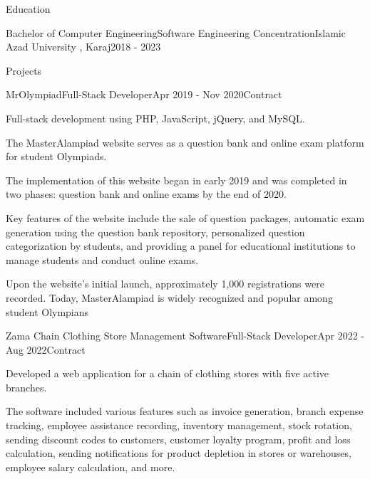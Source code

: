 \documentclass[]{kyvernitis-resume}
\begin{document}
\begin{section}{Education}

   \begin{subsectionnobullet}{Bachelor of Computer Engineering}{Software Engineering Concentration}{Islamic Azad University , Karaj}{2018 - 2023}
    \end{subsectionnobullet}
    
\end{section}

\begin{section}{Projects}
    \begin{subsection}{MrOlympiad}{Full-Stack Developer}{Apr 2019 - Nov 2020}{Contract}
     		\item Full-stack development using PHP, JavaScript, jQuery, and MySQL.
		\item	The MasterAlampiad website serves as a question bank and online exam platform for student Olympiads.
		\item	The implementation of this website began in early 2019 and was completed in two phases: question bank and online exams by the end of 2020.
		\item	Key features of the website include the sale of question packages, automatic exam generation using the question bank repository, personalized question categorization by students, and providing a panel for educational institutions to manage students and conduct online exams.
		\item	Upon the website's initial launch, approximately 1,000 registrations were recorded. Today, MasterAlampiad is widely recognized and popular among student Olympians

    \end{subsection}
    \begin{subsection}{Zama Chain Clothing Store Management Software}{Full-Stack Developer}{Apr 2022 - Aug 2022}{Contract}
     		\item Developed a web application for a chain of clothing stores with five active branches.
		\item The software included various features such as invoice generation, branch expense tracking, employee assistance recording, inventory management, stock rotation, sending discount codes to customers, customer loyalty program, profit and loss calculation, sending notifications for product depletion in stores or warehouses, employee salary calculation, and more.


\end{subsection}
\end{section}
\end{document}
